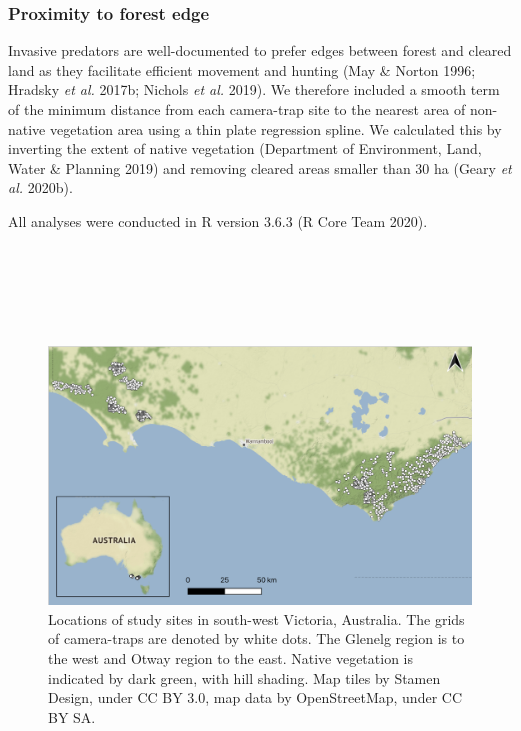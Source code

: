 \documentclass[11pt,a4paper,titlepage,twoside,openright]{style/unimelbthesis}
\begin{document}
\begin{mainmatter}
\hypertarget{proximity-to-forest-edge}{%
\subsubsection{Proximity to forest edge}\label{proximity-to-forest-edge}}

Invasive predators are well-documented to prefer edges between forest and cleared land as they facilitate efficient movement and hunting (May \& Norton 1996; Hradsky \emph{et al.} 2017b; Nichols \emph{et al.} 2019). We therefore included a smooth term of the minimum distance from each camera-trap site to the nearest area of non-native vegetation area using a thin plate regression spline. We calculated this by inverting the extent of native vegetation (Department of Environment, Land, Water \& Planning 2019) and removing cleared areas smaller than 30 ha (Geary \emph{et al.} 2020b).

All analyses were conducted in R version 3.6.3 (R Core Team 2020).

\newpage

\(~\)

\(~\)

\(~\)
\begin{figure}

{\centering \includegraphics[width=1\linewidth]{figure/map_cams} 

}

\caption{Locations of study sites in south-west Victoria, Australia. The grids of camera-traps are denoted by white dots. The Glenelg region is to the west and Otway region to the east. Native vegetation is indicated by dark green, with hill shading. Map tiles by Stamen Design, under CC BY 3.0, map data by OpenStreetMap, under CC BY SA.}\label{fig:occ-map}
\end{figure}
\newpage


\end{mainmatter}
\end{document}
